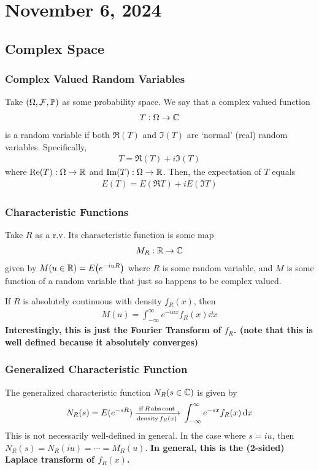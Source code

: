 \section{November 6, 2024}


\subsection{Complex Space}

\subsubsection{Complex Valued Random Variables}
Take $(\Omega, \mathcal{F}, \mathbb{P})$ as some probability space. We say that a complex valued function
\begin{align}
    T: \Omega \to \mathbb{C}
\end{align}
is a random variable if both $\Re(T)$ and $\Im(T)$ are `normal' (real) random variables. Specifically,
\begin{align}
    T = \Re(T) + i\Im(T)
\end{align}
where $\Re(T): \Omega \to \mathbb{R}$ and $\Im(T): \Omega \to \mathbb{R}$. Then, the expectation of $T$ equals
\begin{align}
    E(T) = E(\Re T) + iE(\Im T)
\end{align}

\subsubsection{Characteristic Functions}
Take $R$ as a r.v. Its characteristic function is some map
\begin{align}
    M_R : \mathbb{R} \to \mathbb{C}
\end{align}
given by $M(u \in \mathbb{R}) = E\qty(e^{-iuR})$ where $R$ is some random variable, and $M$ is some function of a random variable that just so happens to be complex valued.

\begin{proposition}
    If $R$ is absolutely continuous with density $f_R(x)$, then
    \begin{align}
        M(u) = \int_{-\infty}^\infty e^{-iux} f_R(x) \dd{x}
    \end{align}
    \textbf{Interestingly, this is just the Fourier Transform of $f_R$. (note that this is well defined because it absolutely converges)}
\end{proposition}

\subsubsection{Generalized Characteristic Function}
The generalized characteristic function $N_R(s \in \mathbb{C})$ is given by
\begin{align}
    N_R(s) = E(e^{-sR}) \ce{->[if $R$ abs cont][density $f_R(x)$]} \int_{-\infty}^\infty e^{-sx} f_R(x) \dd{x}
\end{align}
This is not necessarily well-defined in general. In the case where $s = iu$, then $N_R(s) = N_R(iu) = \cdots = M_R(u)$. \textbf{In general, this is the (2-sided) Laplace transform of $f_R(x)$.}


